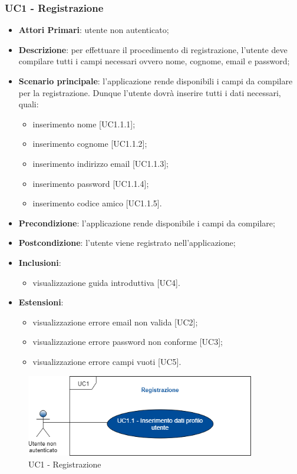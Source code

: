 \subsubsection{UC1 - Registrazione}
\begin{itemize}
	\item \textbf{Attori Primari}: utente non autenticato;
	\item \textbf{Descrizione}: per effettuare il procedimento di registrazione, l'utente deve compilare tutti i campi necessari ovvero nome, cognome, email e password;
	\item \textbf{Scenario principale}: l'applicazione rende disponibili i campi da compilare per la registrazione. Dunque l'utente dovrà inserire tutti i dati necessari, quali:
		\begin{itemize}
			\item inserimento nome [UC1.1.1];
			\item inserimento cognome [UC1.1.2];
			\item inserimento indirizzo email [UC1.1.3];
			\item inserimento password [UC1.1.4];
			\item inserimento codice amico [UC1.1.5].
		\end{itemize}
	\item \textbf{Precondizione}: l'applicazione rende disponibile i campi da compilare;
	\item \textbf{Postcondizione}: l'utente viene registrato nell'applicazione;
	\item \textbf{Inclusioni}:
		\begin{itemize}
			\item visualizzazione guida introduttiva [UC4].
		\end{itemize}
	\item \textbf{Estensioni}:
		\begin{itemize}
			\item visualizzazione errore email non valida [UC2];
			\item visualizzazione errore password non conforme [UC3];
			\item visualizzazione errore campi vuoti [UC5]. 
		\end{itemize} 
\end{itemize}
\begin{figure}[h]
	\includegraphics[width=10cm]{res/images/UC1Registrazione.png}
	\centering
	\caption{UC1 - Registrazione}
\end{figure}
